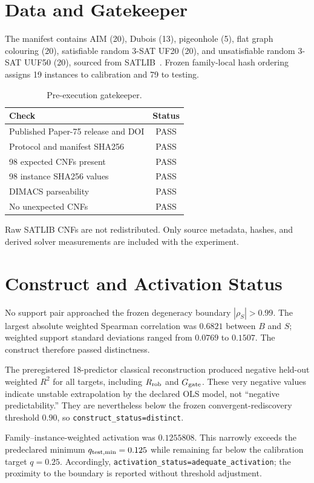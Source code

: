 \documentclass[11pt,a4paper]{article}
\newcommand{\Rrob}{R_{\rm rob}}
\newcommand{\Ggate}{G_{\rm gate}}
\begin{document}
\section{Data and Gatekeeper}

The manifest contains AIM (20), Dubois (13), pigeonhole (5), flat graph
colouring (20), satisfiable random 3-SAT UF20 (20), and unsatisfiable random
3-SAT UUF50 (20), sourced from SATLIB~\cite{satlib}.  Frozen family-local
hash ordering assigns 19 instances to calibration and 79 to testing.

\begin{table}[H]
\centering
\caption{Pre-execution gatekeeper.}
\begin{tabular}{lc}
\toprule
Check & Status\\
\midrule
Published Paper-75 release and DOI & PASS\\
Protocol and manifest SHA256 & PASS\\
98 expected CNFs present & PASS\\
98 instance SHA256 values & PASS\\
DIMACS parseability & PASS\\
No unexpected CNFs & PASS\\
\bottomrule
\end{tabular}
\end{table}

Raw SATLIB CNFs are not redistributed.  Only source metadata, hashes, and
derived solver measurements are included with the experiment.

\section{Construct and Activation Status}

No support pair approached the frozen degeneracy boundary
$|\rho_S|>0.99$.  The largest absolute weighted Spearman correlation was
$0.6821$ between $B$ and $S$; weighted support standard deviations ranged from
$0.0769$ to $0.1507$.  The construct therefore passed distinctness.

The preregistered 18-predictor classical reconstruction produced negative
held-out weighted $R^2$ for all targets, including $\Rrob$ and $\Ggate$.
These very negative values indicate unstable extrapolation by the declared OLS
model, not ``negative predictability.''  They are nevertheless below the
frozen convergent-rediscovery threshold $0.90$, so
\texttt{construct\_status=distinct}.

Family--instance-weighted activation was $0.1255808$.  This narrowly exceeds
the predeclared minimum $q_{\rm test,min}=0.125$ while remaining far below the
calibration target $q=0.25$.  Accordingly,
\texttt{activation\_status=adequate\_activation}; the proximity to the boundary
is reported without threshold adjustment.
\end{document}
